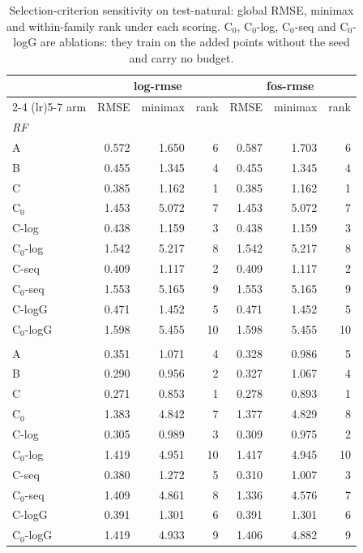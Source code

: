 \begin{table}[htbp]
\centering
\caption{Selection-criterion sensitivity on test-natural: global RMSE, minimax and within-family rank under each scoring. C$_0$, C$_0$-log, C$_0$-seq and C$_0$-logG are ablations: they train on the added points without the seed and carry no budget.}
\label{tab:test-natural:scorings}
\begin{tabular}{lrrrrrr}
\toprule
 & \multicolumn{3}{c}{log-rmse} & \multicolumn{3}{c}{fos-rmse} \\
\cmidrule(lr){2-4} \cmidrule(lr){5-7}
arm & RMSE & minimax & rank & RMSE & minimax & rank \\
\midrule
\multicolumn{7}{l}{\textit{RF}} \\
A & 0.572 & 1.650 & 6 & 0.587 & 1.703 & 6 \\
B & 0.455 & 1.345 & 4 & 0.455 & 1.345 & 4 \\
C & 0.385 & 1.162 & 1 & 0.385 & 1.162 & 1 \\
C$_0$ & 1.453 & 5.072 & 7 & 1.453 & 5.072 & 7 \\
C-log & 0.438 & 1.159 & 3 & 0.438 & 1.159 & 3 \\
C$_0$-log & 1.542 & 5.217 & 8 & 1.542 & 5.217 & 8 \\
C-seq & 0.409 & 1.117 & 2 & 0.409 & 1.117 & 2 \\
C$_0$-seq & 1.553 & 5.165 & 9 & 1.553 & 5.165 & 9 \\
C-logG & 0.471 & 1.452 & 5 & 0.471 & 1.452 & 5 \\
C$_0$-logG & 1.598 & 5.455 & 10 & 1.598 & 5.455 & 10 \\
\addlinespace
\multicolumn{7}{l}{\textit{GBM}} \\
A & 0.351 & 1.071 & 4 & 0.328 & 0.986 & 5 \\
B & 0.290 & 0.956 & 2 & 0.327 & 1.067 & 4 \\
C & 0.271 & 0.853 & 1 & 0.278 & 0.893 & 1 \\
C$_0$ & 1.383 & 4.842 & 7 & 1.377 & 4.829 & 8 \\
C-log & 0.305 & 0.989 & 3 & 0.309 & 0.975 & 2 \\
C$_0$-log & 1.419 & 4.951 & 10 & 1.417 & 4.945 & 10 \\
C-seq & 0.380 & 1.272 & 5 & 0.310 & 1.007 & 3 \\
C$_0$-seq & 1.409 & 4.861 & 8 & 1.336 & 4.576 & 7 \\
C-logG & 0.391 & 1.301 & 6 & 0.391 & 1.301 & 6 \\
C$_0$-logG & 1.419 & 4.933 & 9 & 1.406 & 4.882 & 9 \\
\bottomrule
\end{tabular}
\end{table}
